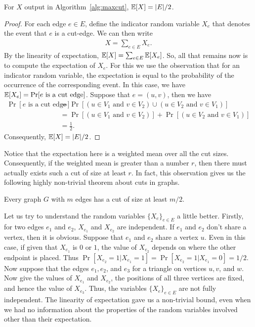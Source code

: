 \begin{lemma}
	For $X$ output in Algorithm~\ref{alg:maxcut}, $\mathbb{E}[X] = |E|/2$.
	\label{lem:size-maxcut}
\end{lemma}
\begin{proof}
	For each edge $e\in E$, define the indicator random variable $X_e$ that denotes the event that $e$ is a cut-edge. We can then write 
	\begin{align*}
		X = \sum_{e\in E} X_e.
	\end{align*}
	By the linearity of expectation, $\mathbb{E}[X] = \sum_{e\in E} \mathbb{E}[X_e]$. So, all that remains now is to compute the expectation of $X_e$. For this we use the observation that for an indicator random variable, the expectation is equal to the probability of the occurrence of the corresponding event. In this case, we have $\mathbb{E}[X_e] = \Pr[\text{$e$ is a cut edge}]$. Suppose that $e=(u,v)$, then we have
	\begin{align*}
		\Pr[\text{$e$ is a cut edge}] &= \Pr[(u \in V_1 \text{ and } v\in V_2) \cup (u \in V_2 \text{ and } v\in V_1)]\\
		&= \Pr[(u \in V_1 \text{ and } v\in V_2)] + \Pr[(u \in V_2 \text{ and } v\in V_1)] \\ &= \frac{1}{2}.
	\end{align*}
	Consequently, $\mathbb{E}[X] = |E|/2$.
\end{proof}

Notice that the expectation here is a weighted mean over all the cut sizes. Consequently, if the weighted mean is greater than a number $r$, then there must actually exists such a cut of size at least $r$. In fact, this observation gives us the following highly non-trivial theorem about cuts in graphs.

\begin{theorem}
	Every graph $G$ with $m$ edges has a cut of size at least $m/2$.
	\label{thm:maxcut}
\end{theorem}


Let us try to understand the random variables $\{X_e\}_{e\in E}$ a little better. Firstly, for two edges $e_1$ and $e_2$, $X_{e_1}$ and $X_{e_2}$ are independent. If $e_1$ and $e_2$ don't share a vertex, then it is obvious. Suppose that $e_1$ and $e_2$ share a vertex $u$. Even in this case, if given that $X_{e_1}$ is $0$ or $1$, the value of $X_{e_2}$ depends on where the other endpoint is placed. Thus $\Pr[X_{e_2}=1 | X_{e_1}=1] = \Pr[X_{e_2}=1 | X_{e_1}=0] = 1/2$. Now suppose that the edges $e_1, e_2$, and $e_3$ for a triangle on vertices $u,v$, and $w$. Now give the values of $X_{e_1}$ and $X_{e_2}$, the positions of all three vertices are fixed, and hence the value of $X_{e_3}$. Thus, the variables $\{X_e\}_{e\in E}$ are not fully independent. The linearity of expectation gave us a non-trivial bound, even when we had no information about the properties of the random variables involved other than their expectation.

